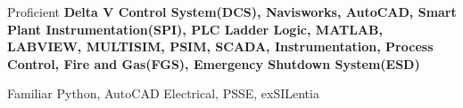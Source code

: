 


\begin{cvskills}


\cvskill
{Proficient} %
{ \textbf{Delta V Control System(DCS), Navisworks, AutoCAD, Smart Plant Instrumentation(SPI), PLC Ladder Logic, MATLAB, LABVIEW, MULTISIM, PSIM, SCADA, Instrumentation, Process Control, Fire and Gas(FGS), Emergency Shutdown System(ESD)}} %



\cvskill
{Familiar} %
{Python, AutoCAD Electrical, PSSE, exSILentia} %




\end{cvskills}